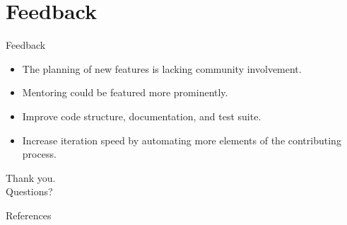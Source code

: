 \documentclass{beamer}
\theoremstyle{definition}
\begin{document}
\section{Feedback}
\begin{frame}{Feedback}
\begin{itemize}
    \item The planning of new features is lacking community involvement.\pause
    \item Mentoring could be featured more prominently.\pause
    \item Improve code structure, documentation, and test suite.\pause
    \item Increase iteration speed by automating more elements of the contributing process.
\end{itemize}
\end{frame}

\begin{frame}{}
\centering
Thank you. \\
Questions?
\end{frame}

\begin{frame}[allowframebreaks]{References}

\printbibliography

\end{frame}
\end{document}
